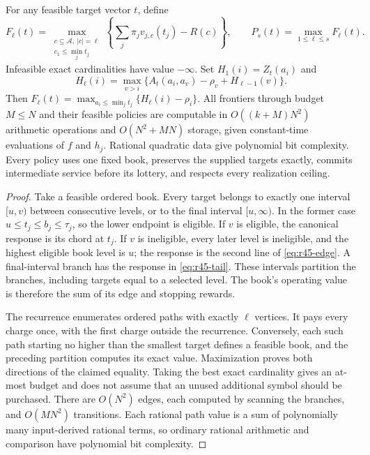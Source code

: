 \begin{theorem}\label{thm:r45-frontier}
For any feasible target vector $t$, define
\[
 F_\ell(t)=\max_{\substack{c\subseteq\mathcal A,\ |c|=\ell\\c_1\leq\min_jt_j}}
 \left\{\sum_j\pi_jv_{j,c}(t_j)-R(c)\right\},\qquad
 P_s(t)=\max_{1\leq\ell\leq s}F_\ell(t).
\]
Infeasible exact cardinalities have value $-\infty$. Set $H_1(i)=Z_t(a_i)$ and
\begin{equation}\label{eq:r45-dp}
 H_\ell(i)=\max_{v>i}\{A_t(a_i,a_v)-\rho_v+H_{\ell-1}(v)\}.
\end{equation}
Then $F_\ell(t)=\max_{a_i\leq\min_jt_j}\{H_\ell(i)-\rho_i\}$. All frontiers through budget $M\leq N$ and their feasible policies are computable in $O((k+M)N^2)$ arithmetic operations and $O(N^2+MN)$ storage, given constant-time evaluations of $f$ and $h_j$. Rational quadratic data give polynomial bit complexity. Every policy uses one fixed book, preserves the supplied targets exactly, commits intermediate service before its lottery, and respects every realization ceiling.
\end{theorem}
\begin{proof}
Take a feasible ordered book. Every target belongs to exactly one interval $[u,v)$ between consecutive levels, or to the final interval $[u,\infty)$. In the former case $u\leq t_j\leq b_j\leq\tau_j$, so the lower endpoint is eligible. If $v$ is eligible, the canonical response is its chord at $t_j$. If $v$ is ineligible, every later level is ineligible, and the highest eligible book level is $u$; the response is the second line of \eqref{eq:r45-edge}. A final-interval branch has the response in \eqref{eq:r45-tail}. These intervals partition the branches, including targets equal to a selected level. The book's operating value is therefore the sum of its edge and stopping rewards.

The recurrence enumerates ordered paths with exactly $\ell$ vertices. It pays every charge once, with the first charge outside the recurrence. Conversely, each such path starting no higher than the smallest target defines a feasible book, and the preceding partition computes its exact value. Maximization proves both directions of the claimed equality. Taking the best exact cardinality gives an at-most budget and does not assume that an unused additional symbol should be purchased. There are $O(N^2)$ edges, each computed by scanning the branches, and $O(MN^2)$ transitions. Each rational path value is a sum of polynomially many input-derived rational terms, so ordinary rational arithmetic and comparison have polynomial bit complexity.
\end{proof}

